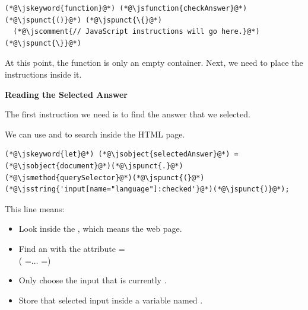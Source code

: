 \documentclass{article}
\begin{document}
\vspace{0.2cm}

\begin{lstlisting}
(*@\jskeyword{function}@*) (*@\jsfunction{checkAnswer}@*)(*@\jspunct{()}@*) (*@\jspunct{\{}@*)
  (*@\jscomment{// JavaScript instructions will go here.}@*)
(*@\jspunct{\}}@*)
\end{lstlisting}

\vspace{0.2cm}

At this point, the function is only an empty container.
Next, we need to place the instructions inside it.

\vspace{0.4cm}

\textbf{\Bitter\textcolor{naranja}{Reading the Selected Answer}}

\vspace{0.1cm}

The first instruction we need is to find the answer that we selected.

We can use  and  to search inside the HTML page.

\vspace{0.2cm}

\begin{lstlisting}
(*@\jskeyword{let}@*) (*@\jsobject{selectedAnswer}@*) = (*@\jsobject{document}@*)(*@\jspunct{.}@*)(*@\jsmethod{querySelector}@*)(*@\jspunct{(}@*)(*@\jsstring{'input[name="language"]:checked'}@*)(*@\jspunct{)}@*);
\end{lstlisting}

\vspace{0.2cm}

This line means:

\begin{itemize}[leftmargin=1.2cm, itemsep=4pt]
  \item Look inside the , which means the web page.
  \item Find an  with the  attribute =\inlineattr{)}\\
        ( =... =)
  \item Only choose the input that is currently .
  \item Store that selected input inside a variable named .
\end{itemize}
\end{document}
